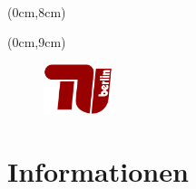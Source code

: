 \begin{titlepage}
			
	\centering
	{\LARGE \sffamily {\textbf{\bottom}\par}}
	\vspace{2,5cm}
    {\fontsize{20}{0}\sffamily{}\par}
    \vspace{6cm}
	{\Large\sffamily {}\par}
	\IfSubStr {\titel} {\\[1cm]} {} {}


		{
			\begin{textblock*}{21cm}(0cm,8cm) %
				{\fontsize{\schriftgrosse}{0}\sffamily\textcolor{\farbe}{\textbf{\titel}}\par}
			\end{textblock*}
		}
		{
			\begin{textblock*}{21cm}(0cm,9cm) %
				{\fontsize{\schriftgrosse}{0}\sffamily\textcolor{\farbe}{\textbf{\titel}}\par}
			\end{textblock*} 
		}
	
	
	\vspace{10cm}
	{\large{}}
	
	\vfill

	\begin{figure}[h]
	\begin{center}
		
		\includegraphics[width=2cm]{Bilder/Logo/TUlogo.png}
		
	\end{center}
	\end{figure}
	
\end{titlepage}

\restoregeometry

\chapter*{Informationen}
\label{chap:info}

